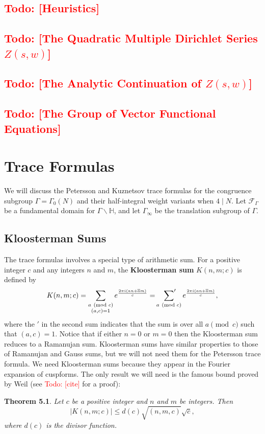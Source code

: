 \documentclass[12pt]{book}
\newtheorem{theorem}{Theorem}[section]
\theoremstyle{definition}\newframedtheorem{method}{Method}
\newcommand{\psum}{\sideset{}{'}\sum}
\newcommand{\tmod}[1]{\ \left(\text{mod }#1\right)}
\newcommand{\mc}{\mathcal}
\renewcommand{\H}{\mathbb{H}}
\newcommand{\G}{\Gamma}
\newcommand{\<}{\langle}
\renewcommand{\>}{\rangle}
\newcommand{\conj}{\overline}
\newcommand{\GH}{\G\backslash\H}
\newcommand{\todo}[1]{\textcolor{red}{\sf Todo: [#1]}}
\begin{document}
  \section{\todo{Heuristics}}
  \section{\todo{The Quadratic Multiple Dirichlet Series \texorpdfstring{$Z(s,w)$}{Z(s,w)}}}
  \section{\todo{The Analytic Continuation of \texorpdfstring{$Z(s,w)$}{Z(s,w)}}}
  \section{\todo{The Group of Vector Functional Equations}}

\chapter{Trace Formulas}
  We will discuss the Petersson and Kuznetsov trace formulas for the congruence subgroup $\G = \G_{0}(N)$ and their half-integral weight variants when $4 \mid N$. Let $\mc{F}_{\G}$ be a fundamental domain for $\GH$, and let $\G_{\infty}$ be the translation subgroup of $\G$.
  \section{Kloosterman Sums}
    The trace formulas involves a special type of arithmetic sum. For a positive integer $c$ and any integers $n$ and $m$, the \textbf{Kloosterman sum} $K(n,m;c)$ is defined by
    \[
      K(n,m;c) = \sum_{\substack{a \tmod{c} \\ (a,c) = 1}}e^{\frac{2\pi i(an+\conj{a}m)}{c}} = \psum_{a \tmod{c}}e^{\frac{2\pi i(an+\conj{a}m)}{c}},
    \]
    where the $'$ in the second sum indicates that the sum is over all $a \pmod{c}$ such that $(a,c) = 1$. Notice that if either $n = 0$ or $m = 0$ then the Kloosterman sum reduces to a Ramanujan sum. Kloosterman sums have similar properties to those of Ramanujan and Gauss sums, but we will not need them for the Petersson trace formula. We need Kloosterman sums because they appear in the Fourier expansion of cuspforms. The only result we will need is the famous bound proved by Weil (see \todo{cite} for a proof):

    \begin{theorem}
      Let $c$ be a positive integer and $n$ and $m$ be integers. Then
      \[
        |K(n,m;c)| \le d(c)\sqrt{(n,m,c)}\sqrt{c},
      \]
      where $d(c)$ is the divisor function.
    \end{theorem}
\end{document}

